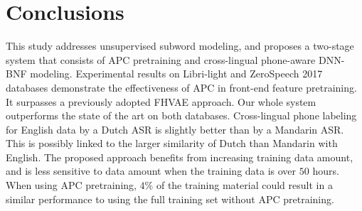 \documentclass[a4paper]{article}
\begin{document}


\section{Conclusions}
This study addresses unsupervised subword modeling, and proposes a two-stage system that consists of APC pretraining and cross-lingual phone-aware DNN-BNF modeling.  
Experimental results on Libri-light and ZeroSpeech 2017 databases demonstrate the effectiveness of APC in front-end feature pretraining. It surpasses a previously adopted FHVAE approach. Our whole system outperforms the state of the art on both databases. 
Cross-lingual phone labeling for English data by a Dutch ASR is slightly better than by a Mandarin ASR. This is possibly linked to the larger similarity of Dutch than Mandarin with  English.  
The proposed approach benefits from increasing training data amount, and is less sensitive to data amount when the training data is over $50$ hours. 
When using APC pretraining, $4\%$ of the training material could result in a similar   performance to   using the full training set without  APC pretraining.








\end{document}
